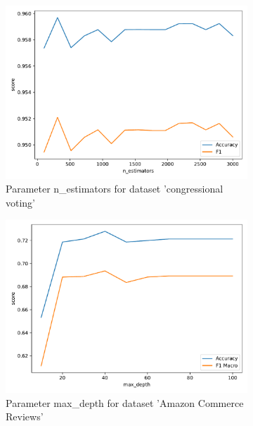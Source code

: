 \documentclass[a4paper,10pt]{article}
\begin{document}
\begin{figure}[h!]
    \captionsetup{justification=centering}
    \begin{subfigure}[b]{0.45\textwidth}
        \includegraphics[width=\textwidth]{congress/plots/RandomForestClassifier_n_estimators_sensitivity.pdf}
        \caption{Parameter \textsf{n\_estimators} for dataset 'congressional voting'}
    \end{subfigure}
    \hfill
    \begin{subfigure}[b]{0.45\textwidth}
        \includegraphics[width=\textwidth]{amazon/plots/RandomForestClassifier_max_depth_sensitivity.pdf}
        \caption{Parameter \textsf{max\_depth} for dataset 'Amazon Commerce Reviews'}
    \end{subfigure}
    \vfill
    \begin{subfigure}[b]{0.45\textwidth}

\end{subfigure}
\end{figure}
\end{document}
